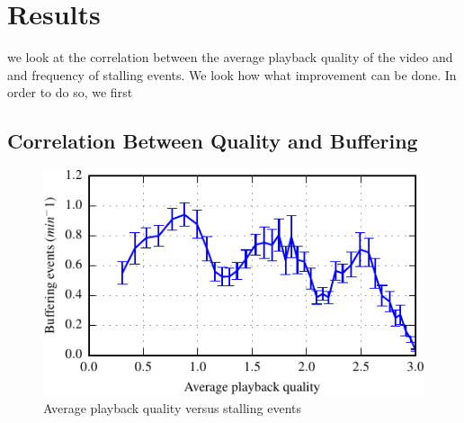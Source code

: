 
\section{Results}
\label{sec:results}

we look at the correlation between the average playback quality of the video and and frequency of stalling events. We look how what improvement can be done. In order to do so, we first 

\subsection{Correlation Between Quality and Buffering}

\begin{figure}[t]
\centering
\includegraphics[width=\columnwidth]{figs/33qualityvstalling}%
\caption{Average playback quality versus stalling events}
\label{fig:qualityvsstalling}%
\end{figure}

